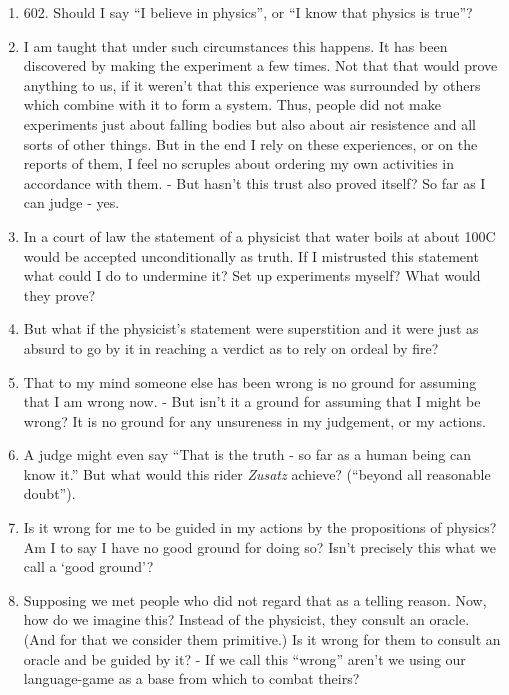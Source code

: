 \documentclass{book}
\begin{document}
\begin{enumerate}
\item

602.
Should I say ``I believe in physics'', or ``I know that physics is true''?

\item
I am taught that under such circumstances this happens. It has been discovered
by making the experiment a few times. Not that that would prove anything to us,
if it weren't that this experience was surrounded by others which combine with
it to form a system. Thus, people did not make experiments just about falling
bodies but also about air resistence and all sorts of other things.  But in the
end I rely on these experiences, or on the reports of them, I feel no scruples
about ordering my own activities in accordance with them. - But hasn't this
trust also proved itself? So far as I can judge - yes.

\item
In a court of law the statement of a physicist that water boils at about 100C
would be accepted unconditionally as truth.  If I mistrusted this statement
what could I do to undermine it? Set up experiments myself? What would they
prove?

\item
But what if the physicist's statement were superstition and it were just as
absurd to go by it in reaching a verdict as to rely on ordeal by fire?

\item
That to my mind someone else has been wrong is no ground for assuming that I am
wrong now. - But isn't it a ground for assuming that I might be wrong? It is no
ground for any unsureness in my judgement, or my actions.

\item
A judge might even say ``That is the truth - so far as a human being can know
it.'' But what would this rider \emph{Zusatz} achieve? (``beyond all reasonable
doubt'').

\item
Is it wrong for me to be guided in my actions by the propositions of physics?
Am I to say I have no good ground for doing so? Isn't precisely this what we
call a `good ground'?

\item
Supposing we met people who did not regard that as a telling reason. Now, how
do we imagine this? Instead of the physicist, they consult an oracle. (And for
that we consider them primitive.) Is it wrong for them to consult an oracle and
be guided by it? - If we call this ``wrong'' aren't we using our language-game
as a base from which to combat theirs?


\end{enumerate}
\end{document}
